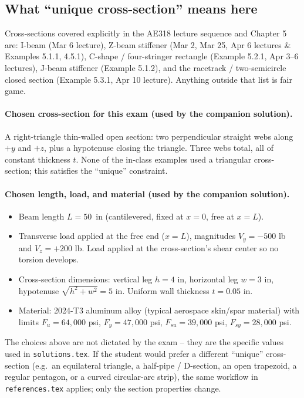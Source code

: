 \documentclass[11pt]{article}
\begin{document}
\subsection*{What ``unique cross-section'' means here}

Cross-sections covered explicitly in the AE318 lecture sequence and Chapter 5 are: I-beam (Mar 6 lecture), Z-beam stiffener (Mar 2, Mar 25, Apr 6 lectures \& Examples 5.1.1, 4.5.1), C-shape / four-stringer rectangle (Example 5.2.1, Apr 3--6 lectures), J-beam stiffener (Example 5.1.2), and the racetrack / two-semicircle closed section (Example 5.3.1, Apr 10 lecture). Anything outside that list is fair game.

\paragraph{Chosen cross-section for this exam (used by the companion solution).} A right-triangle thin-walled open section: two perpendicular straight webs along $+y$ and $+z$, plus a hypotenuse closing the triangle. Three webs total, all of constant thickness $t$. None of the in-class examples used a triangular cross-section; this satisfies the ``unique'' constraint.

\paragraph{Chosen length, load, and material (used by the companion solution).}
\begin{itemize}[leftmargin=2em, itemsep=1pt]
  \item Beam length $L = 50$~in (cantilevered, fixed at $x = 0$, free at $x = L$).
  \item Transverse load applied at the free end ($x = L$), magnitudes $V_y = -500$ lb and $V_z = +200$ lb. Load applied at the cross-section's shear center so no torsion develops.
  \item Cross-section dimensions: vertical leg $h = 4$ in, horizontal leg $w = 3$ in, hypotenuse $\sqrt{h^2+w^2} = 5$ in. Uniform wall thickness $t = 0.05$ in.
  \item Material: 2024-T3 aluminum alloy (typical aerospace skin/spar material) with limits $F_u = 64{,}000$ psi, $F_y = 47{,}000$ psi, $F_{su} = 39{,}000$ psi, $F_{sy} = 28{,}000$ psi.
\end{itemize}

\begin{verifybox}
The choices above are not dictated by the exam -- they are the specific values used in \texttt{solutions.tex}. If the student would prefer a different ``unique'' cross-section (e.g.\ an equilateral triangle, a half-pipe / D-section, an open trapezoid, a regular pentagon, or a curved circular-arc strip), the same workflow in \texttt{references.tex} applies; only the section properties change.
\end{verifybox}
\end{document}
